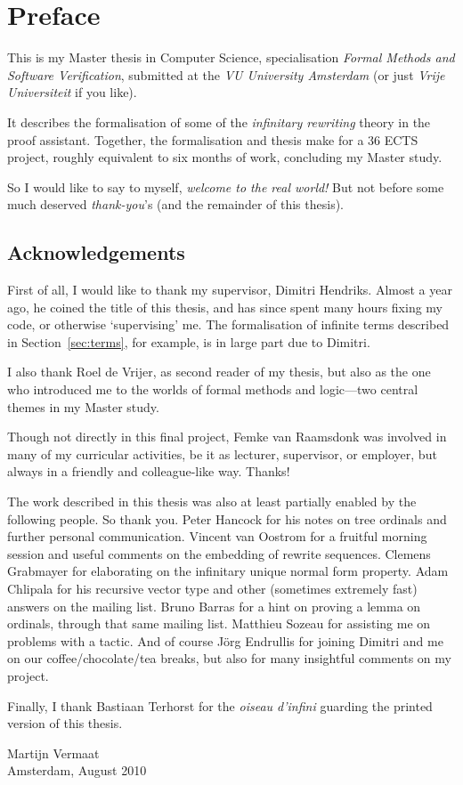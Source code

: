\chapter*{Preface}
\thispagestyle{empty}

This is my Master thesis in Computer Science,
specialisation \emph{Formal Methods and Software Verification},
submitted at the \emph{VU University Amsterdam} (or just \emph{Vrije
  Universiteit} if you like).

It describes the formalisation of some of the \emph{infinitary
  rewriting} theory in the \Coq proof assistant.
Together, the formalisation and thesis make
for a 36 ECTS project, roughly equivalent to six months of work,
concluding my Master study.

So I would like to say to myself, \emph{welcome to the real world!}
But not before some much deserved \emph{thank-you}'s (and the
remainder of this thesis).


\section*{Acknowledgements}

First of all, I would like to thank my supervisor, Dimitri
Hendriks. Almost a year ago, he coined the title of this thesis, and
has since spent many hours fixing my \Coq code, or otherwise
`supervising' me. The formalisation of infinite terms described in
Section~\ref{sec:terms}, for example, is in large part due to
Dimitri.

I also thank Roel de Vrijer, as second reader of my thesis, but also
as the one who introduced me to the worlds of formal methods and
logic---two central themes in my Master study.

Though not directly in this final project, Femke van Raamsdonk was
involved in many of my curricular activities, be it as lecturer,
supervisor, or employer, but always in a friendly and colleague-like
way. Thanks!

The work described in this thesis was also at least partially enabled
by the following people. So thank you. Peter Hancock for his notes on
tree ordinals and further personal communication. Vincent van Oostrom
for a fruitful morning session and useful comments on the embedding of
rewrite sequences. Clemens Grabmayer for elaborating on the infinitary
unique normal form property. Adam Chlipala for his recursive vector type and
other (sometimes extremely fast) answers on the \Coq mailing
list. Bruno Barras for a hint on proving a lemma on ordinals, through
that same mailing list. Matthieu Sozeau for assisting me on problems
with a \Coq tactic. And of course J\"org Endrullis for joining Dimitri
and me on our coffee/chocolate/tea breaks, but also for many insightful
comments on my project.

Finally, I thank Bastiaan Terhorst for the \emph{oiseau d'infini}
guarding the printed version of this thesis.


\thispagestyle{empty}

\begin{flushright}
  Martijn Vermaat\\
  Amsterdam, August 2010
\end{flushright}
